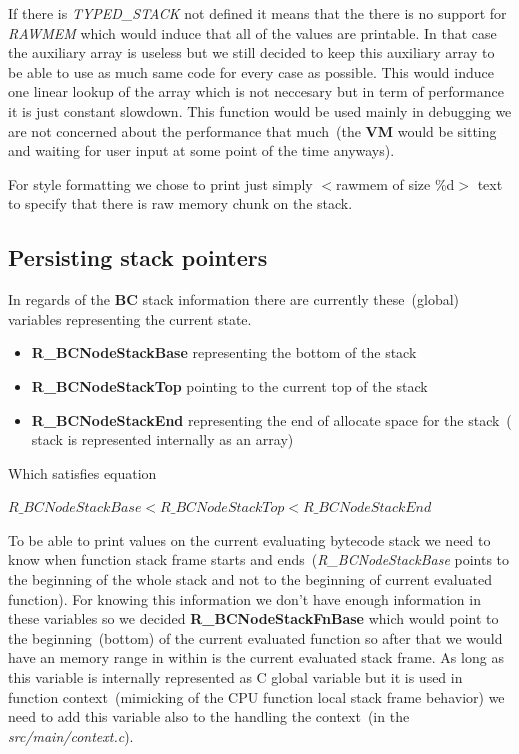 \documentclass[thesis=M,english]{FITthesis}[2018/10/20]
\begin{document}
If there is \textit{TYPED{\_}STACK} not defined it means that the there is no support for \textit{RAWMEM} which would induce that all of the values are printable. In that case the auxiliary array is useless but we still decided to keep this auxiliary array to be able to use as much same code for every case as possible. This would induce one linear lookup of the array which is not neccesary but in term of performance it is just constant slowdown. This function would be used mainly in debugging we are not concerned about the performance that much~(the \textbf{VM} would be sitting and waiting for user input at some point of the time anyways).

For style formatting we chose to print just simply $<$rawmem of size \%d$>$ text to specify that there is raw memory chunk on the stack.

\subsection{Persisting stack pointers}\label{persisting-stack-pointers}

In regards of the \textbf{BC} stack information there are currently these~(global) variables representing the current state.
 
\begin{itemize}
\item \textbf{R{\_}BCNodeStackBase} representing the bottom of the stack
	\item \textbf{R{\_}BCNodeStackTop} pointing to the current top of the stack
	\item \textbf{R{\_}BCNodeStackEnd} representing the end of allocate space for the stack~( stack is represented internally as an array)
\end{itemize}

Which satisfies equation 

$R{\_}BCNodeStackBase < R{\_}BCNodeStackTop < R{\_}BCNodeStackEnd$

To be able to print values on the current evaluating bytecode stack we need to know when function stack frame starts and ends~(\textit{R{\_}BCNodeStackBase} points to the beginning of the whole stack and not to the beginning of current evaluated function). For knowing this information we don't have enough information in these variables so we decided \textbf{R{\_}BCNodeStackFnBase} which would point to the beginning~(bottom) of the current evaluated function so after that we would have an memory range in within is the current evaluated stack frame. As long as this variable is internally represented as C global variable but it is used in function context~(mimicking of the CPU function local stack frame behavior) we need to add this variable also to the handling the context~(in the \textit{src/main/context.c}).
\end{document}
